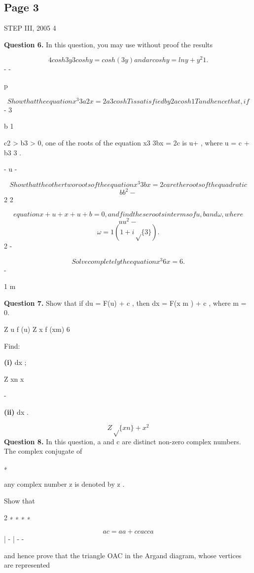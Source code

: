 \documentclass[12pt]{article}
\begin{document}
\subsection*{Page 3}
\begin{flushleft}
STEP III, 2005 4\par
\bigskip\textbf{Question 6.} In this question, you may use without proof the results\par
\[4 cosh 3 y 3 cosh y = cosh(3y) and arcosh y = ln y + y^2 1 .\]
- -\par
\gamma p \delta\par
[ Note: arcoshy is another notation for cosh -1 y ]\par
\[Show that the equation x^3 3a2x = 2a3 cosh T is satisfied by 2a cosh 1 T and hence that, if\]
- 3\par
b   1\par
c2 > b3 > 0, one of the roots of the equation x3 3bx = 2c is u+ , where u = c +  b3 3 .\par
- u -\par
\gamma \delta\par
\[Show that the other two roots of the equation x^3 3bx = 2c are the roots of the quadratic\]
\[b b^2 -\]
2 2\par
\[equation x + u + x + u + b = 0 , and find these roots in terms of u, b and ω, where\]
\[u u^2 -\]
\[ω = 1 ( 1 + i\sqrt\{3\}).\]
2 -\par
\[Solve completely the equation x^3 6x = 6 .\]
-\par
1 m\par
\bigskip\textbf{Question 7.} Show that if du = F(u) + c , then dx = F(x m ) + c , where m = 0.\par
Z u f (u) Z x f (xm) 6\par
Find:\par
\textbf{(i)} dx ;\par
Z xn x\par
-\par
\textbf{(ii)} dx .\par
\[Z \sqrt\{xn\} + x^2\]
\bigskip\textbf{Question 8.} In this question, a and c are distinct non-zero complex numbers. The complex conjugate of\par
∗\par
any complex number z is denoted by z .\par
Show that\par
2 ∗ ∗ ∗ ∗\par
\[a c = aa + cc ac ca\]
| - | - -\par
and hence prove that the triangle OAC in the Argand diagram, whose vertices are represented\par

\end{flushleft}
\end{document}
